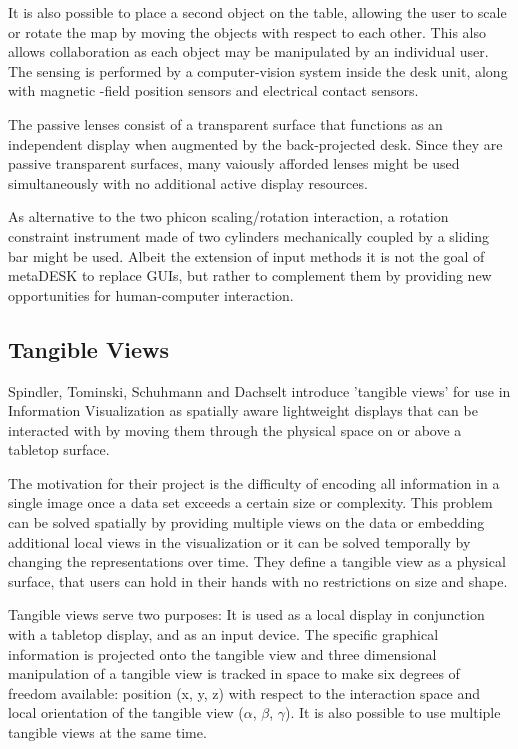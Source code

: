 It is also possible to place a second object on the table, allowing the user to scale or rotate the map by moving the objects with respect to each other. This also allows collaboration as each object may be manipulated by an individual user. The sensing is performed by a computer-vision system inside the desk unit, along with magnetic -field position sensors and electrical contact sensors.

The passive lenses consist of a transparent surface that functions as an independent display when augmented by the back-projected desk. Since they are passive transparent surfaces, many vaiously afforded lenses might be used simultaneously with no additional active display resources.

As alternative to the two phicon scaling/rotation interaction, a rotation constraint instrument made of two cylinders mechanically coupled by a sliding bar might be used.
Albeit the extension of input methods it is not the goal of metaDESK to replace GUIs, but rather to complement them by providing new opportunities for human-computer interaction. 



\subsection{Tangible Views}
Spindler, Tominski, Schuhmann and Dachselt \cite{spindler10} introduce 'tangible views' for use in Information Visualization as spatially aware lightweight displays that can be interacted with by moving them through the physical space on or above a tabletop surface. 

The motivation for their project is the difficulty of encoding all information in a single image once a data set exceeds a certain size or complexity. This problem can be solved spatially by providing multiple views on the data or embedding additional local views in the visualization or it can be solved temporally by changing the representations over time. They define a tangible view as a physical surface, that users can hold in their hands with no restrictions on size and shape.
 
Tangible views serve two purposes: It is used as a local display in conjunction with a tabletop display, and as an input device. The specific graphical information is projected onto the tangible view and three dimensional manipulation of a tangible view is tracked in space to make six degrees of freedom available: position (x, y, z) with respect to the interaction space and local orientation of the tangible view ($\alpha$, $\beta$, $\gamma$). It is also possible to use multiple tangible views at the same time. 


